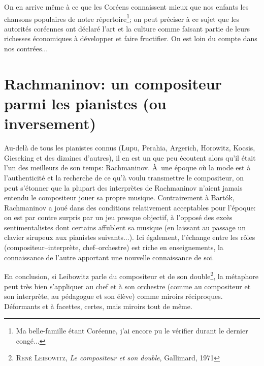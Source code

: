 On en arrive même à ce que les Coréens connaissent mieux que nos enfants les chansons populaires de notre répertoire\footnote{Ma belle-famille étant Coréenne, j'ai encore pu le vérifier durant le dernier congé...}; on peut préciser à ce sujet que les autorités coréennes ont déclaré l'art et la culture comme faisant partie de leurs richesses économiques à développer et faire fructifier. On est loin du compte dans nos contrées...

\section*{Rachmaninov: un compositeur parmi les pianistes (ou inversement)}
Au-delà de tous les pianistes connus (Lupu, Perahia, Argerich, Horowitz, Kocsis, Gieseking et des dizaines d'autres), il en est un que peu écoutent alors qu'il était l'un des meilleurs de son temps: Rachmaninov. À~une époque où la mode est à l'authenticité et la recherche de ce qu'à voulu transmettre le compositeur, on peut s'étonner que la plupart des interprètes de Rachmaninov n'aient jamais entendu le compositeur jouer sa propre musique. Contrairement à Bartók, Rachmaninov a joué dans des conditions relativement acceptables pour l'époque: on est par contre surpris par un jeu presque objectif, à l'opposé des excès sentimentalistes dont certains affublent sa musique (en laissant au passage un clavier sirupeux aux pianistes suivants...). Ici également, l'échange entre les rôles (compositeur--interprète, chef--orchestre) est riche en enseignements, la connaissance de l'autre apportant une nouvelle connaissance de soi.

En conclusion, si Leibowitz parle du compositeur et de son double\footnote{\textsc{René Leibowitz}, \emph{Le compositeur et son double}, Gallimard, 1971}, la métaphore peut très bien s'appliquer au chef et à son orchestre (comme au compositeur et son interprète, au pédagogue et son élève) comme miroirs réciproques. Déformants et à facettes, certes, mais miroirs tout de même.




